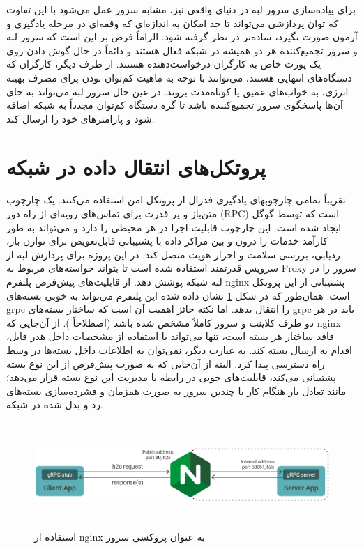 برای پیاده‌سازی سرور لبه در دنیای واقعی نیز، مشابه سرور عمل می‌شود با این تفاوت که توان پردازشی می‌تواند تا حد امکان به اندازه‌ای که وقفه‌ای در مرحله یادگیری و آزمون صورت نگیرد، ساده‌تر در نظر گرفته شود.  الزاماً فرض بر این است که سرور لبه و سرور تجمیع‌کننده هر دو همیشه در شبکه فعال هستند و دائماً در حال گوش دادن روی یک پورت خاص به کارگران درخواست‌دهنده هستند. از طرف دیگر، کارگران که دستگاه‌های انتهایی هستند، می‌توانند با توجه به ماهیت کم‌توان بودن برای مصرف بهینه انرژی، به خواب‌های عمیق یا کوتاه‌مدت بروند. در عین حال سرور لبه می‌تواند به جای آن‌ها پاسخگوی سرور تجمیع‌کننده باشد تا گره دستگاه کم‌توان مجدداً به شبکه اضافه شود و پارامتر‌های خود را ارسال کند.

\section{پروتکل‌های انتقال داده در شبکه}

تقریباً تمامی چارچوبهای یادگیری فدرال از پروتکل امن استفاده می‌کنند.  یک چارچوب متن‌باز و پر قدرت برای تماس‌های رویه‌ای از راه دور (RPC) است که توسط گوگل ایجاد شده است. این چارچوب قابلیت اجرا در هر محیطی را دارد و می‌تواند به طور کارآمد خدمات را درون و بین مراکز داده با پشتیبانی قابل‌تعویض برای توازن بار، ردیابی، بررسی سلامت و احراز هویت متصل کند. در این پروژه برای پردازش لبه از سرویس قدرتمند  استفاده شده است تا بتواند خواسته‌های مربوط به Proxy سرور را در لبه شبکه پوشش دهد.
از قابلیت‌های پیش‌فرض پلتفرم nginx پشتیبانی از این پروتکل است. همان‌طور که در شکل \ref{ grpc } نشان داده شده این پلتفرم می‌تواند به خوبی بسته‌های grpc را انتقال بدهد. اما نکته حائز اهمیت آن است که ساختار بسته‌های grpc باید در هر دو طرف کلاینت و سرور کاملاً مشخص شده باشد (اصطلاحاً ). از آن‌جایی که nginx فاقد ساختار هر بسته است، تنها می‌تواند با استفاده از مشخصات داخل هدر فایل، اقدام به ارسال بسته کند. به عبارت دیگر، نمی‌توان به اطلاعات داخل بسته‌ها در وسط راه دسترسی پیدا کرد. البته از آن‌جایی که به صورت پیش‌فرض از این نوع بسته پشتیبانی می‌کند، قابلیت‌های خوبی در رابطه با مدیریت این نوع بسته قرار می‌دهد؛ مانند تعادل بار هنگام کار با چندین سرور به صورت همزمان و فشرده‌سازی بسته‌های رد و بدل شده در شبکه.

\begin{figure}[H]
    \centering
   \includegraphics[height=4cm,width=14cm]{./GRPC/gRPC-nginx-proxy.png}
   \caption{ استفاده از nginx به عنوان پروکسی سرور}
   \label{ grpc }
   \centering
\end{figure}

